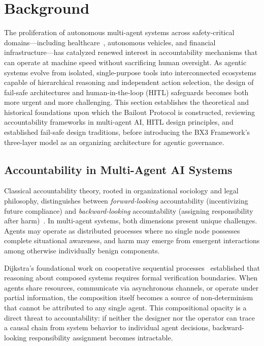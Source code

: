 \section{Background}

The proliferation of autonomous multi-agent systems across safety-critical domains---including healthcare~\cite{bansal2019}, autonomous vehicles, and financial infrastructure---has catalyzed renewed interest in accountability mechanisms that can operate at machine speed without sacrificing human oversight. As agentic systems evolve from isolated, single-purpose tools into interconnected ecosystems capable of hierarchical reasoning and independent action selection, the design of fail-safe architectures and human-in-the-loop (HITL) safeguards becomes both more urgent and more challenging. This section establishes the theoretical and historical foundations upon which the Bailout Protocol is constructed, reviewing accountability frameworks in multi-agent AI, HITL design principles, and established fail-safe design traditions, before introducing the BX3 Framework's three-layer model as an organizing architecture for agentic governance.

\subsection{Accountability in Multi-Agent AI Systems}

Classical accountability theory, rooted in organizational sociology and legal philosophy, distinguishes between \emph{forward-looking} accountability (incentivizing future compliance) and \emph{backward-looking} accountability (assigning responsibility after harm)~\cite{wiener1948}. In multi-agent systems, both dimensions present unique challenges. Agents may operate as distributed processes where no single node possesses complete situational awareness, and harm may emerge from emergent interactions among otherwise individually benign components.

Dijkstra's foundational work on cooperative sequential processes~\cite{dijkstra1982} established that reasoning about composed systems requires formal verification boundaries. When agents share resources, communicate via asynchronous channels, or operate under partial information, the composition itself becomes a source of non-determinism that cannot be attributed to any single agent. This compositional opacity is a direct threat to accountability: if neither the designer nor the operator can trace a causal chain from system behavior to individual agent decisions, backward-looking responsibility assignment becomes intractable.


